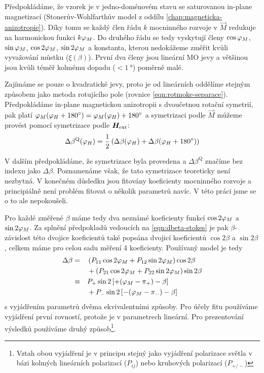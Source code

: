 Předpokládáme, že vzorek je v jedno-doménovém stavu se saturovanou in-plane magnetizací (Stonerův-Wohlfarthův model z oddílu \ref{chap:magneticka-anizotropie}).
Díky tomu se každý člen řádu $k$ mocninného rozvoje v $\vec{M}$ redukuje na harmonickou funkci $k\varphi_M$.
Do druhého řádu se tedy vyskytují členy $\cos\varphi_M$, $\sin\varphi_M$, $\cos2\varphi_M$, $\sin2\varphi_M$ a konstanta, kterou nedokážeme změřit kvůli vyvažování můstku ($\xi(\beta)$).
První dva členy jsou lineární MO jevy a většinou jsou kvůli téměř kolmému dopadu ($< \SI{1}{\degree}$) poměrně malé.

Zajímáme se pouze o kvadratické jevy, proto je od lineárních oddělíme stejným způsobem jako metoda rotujícího pole (rovnice \eqref{eqn:rotmoke-separace}).
Předpokládáme in-plane magnetickou anizotropii s dvoučetnou rotační symetrií, pak platí $\varphi_M(\varphi_H+\SI{180}{\degree})=\varphi_M(\varphi_H)+\SI{180}{\degree}$ a symetrizaci podle $\vec{M}$ můžeme provést pomocí symetrizace podle $\bm{H}_\textrm{ext}$:
\begin{equation}
    \label{eqn:symetrizace-H}
    \Delta\beta^\textrm{Q}(\varphi_H) = \frac{1}{2}\left(\Delta\beta(\varphi_H) + \Delta\beta(\varphi_H+\SI{180}{\degree})\right)
\end{equation}

V dalším předpokládáme, že symetrizace byla provedena a $\Delta\beta^\textrm{Q}$ značíme bez indexu jako $\Delta\beta$.
Poznamenáme však, že tato symetrizace teoreticky není nezbytná.
V konečném důsledku jsou fitovány koeficienty mocninného rozvoje a principiálně není problém fitovat o několik parametrů navíc.
V této práci jsme se o to ale nepokoušeli.

Pro každé změřené $\beta$ máme tedy dva neznámé koeficienty funkcí $\cos2\varphi_M$ a $\sin2\varphi_M$.
Za splnění předpokladů vedoucích na \eqref{eqn:dbeta-stokes} je pak $\beta$-závislost této dvojice koeficientů také popsána dvojicí koeficientů $\cos2\beta$ a $\sin2\beta$, celkem máme pro celou sadu měření 4 koeficienty.
Používaný model je tedy
\begin{alignat}{2}
    \label{eqn:PMLD-matice}
    \Delta\beta &= && \left(P_{11} \cos2\varphi_M + P_{12}\sin2\varphi_M\right)\cos2\beta \\
                    & && + \left(P_{21}\cos2\varphi_M + P_{22}\sin2\varphi_M\right)\sin2\beta \\
                    &\equiv & & P_+ \sin2\left[+(\varphi_M -\pi_+) - \beta\right] \\
                    &  & & + P_- \sin2\left[-(\varphi_M-\pi_-) - \beta\right]
\end{alignat}
s vyjádřením parametrů dvěma ekvivalentními způsoby.
Pro účely fitu používáme vyjádření první rovností, protože je v parametrech lineární.
Pro prezentování výsledků používáme druhý způsob\footnote{Vztah obou vyjádření je v principu stejný jako vyjádření polarizace světla v bázi kolmých lineárních polarizací ($P_{ij}$) nebo kruhových polarizací ($P_{+/-}$)}.

